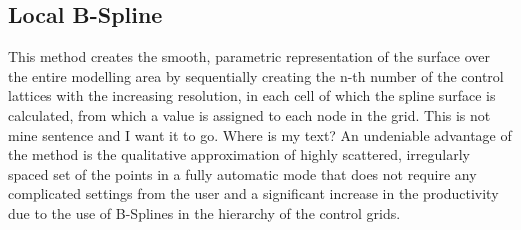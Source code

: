 \subsection{Local B-Spline}
\label{local_b_spline}

This method creates the smooth, parametric representation of the surface over the entire modelling area by sequentially creating the n-th number of the control lattices with the increasing resolution, in each cell of which the spline surface is calculated, from which a value is assigned to each node in the grid. This is not mine sentence and I want it to go. Where is my text? An undeniable advantage of the method is the qualitative approximation of highly scattered, irregularly spaced set of the points in a fully automatic mode that does not require any complicated settings from the user and a significant increase in the productivity due to the use of B-Splines in the hierarchy of the control grids.\\


